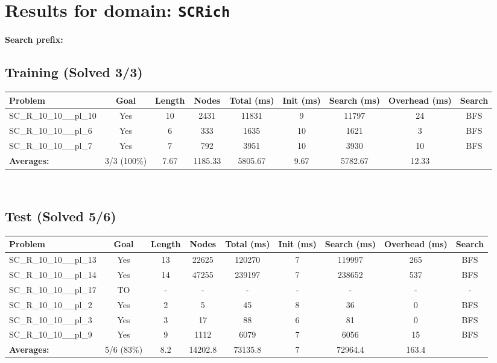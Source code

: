 \documentclass{article}
\begin{document}
\section*{Results for domain: \texttt{SCRich}}
\textbf{Search prefix:} 
\\[0.5cm]
\subsection*{Training (Solved 3/3)}
\begin{tabular}{lcccccccc}
\toprule
Problem & Goal & Length & Nodes & Total (ms) & Init (ms) & Search (ms) & Overhead (ms) & Search \\
\midrule
SC\_R\_10\_10\_\_pl\_10 & Yes & 10 & 2431 & 11831 & 9 & 11797 & 24 & BFS \\
SC\_R\_10\_10\_\_pl\_6 & Yes & 6 & 333 & 1635 & 10 & 1621 & 3 & BFS \\
SC\_R\_10\_10\_\_pl\_7 & Yes & 7 & 792 & 3951 & 10 & 3930 & 10 & BFS \\
\textbf{Averages:} & 3/3 (100\%) & 7.67 & 1185.33 & 5805.67 & 9.67 & 5782.67 & 12.33 & \\
\bottomrule
\end{tabular}
\\[0.7cm]
\subsection*{Test (Solved 5/6)}
\begin{tabular}{lcccccccc}
\toprule
Problem & Goal & Length & Nodes & Total (ms) & Init (ms) & Search (ms) & Overhead (ms) & Search \\
\midrule
SC\_R\_10\_10\_\_pl\_13 & Yes & 13 & 22625 & 120270 & 7 & 119997 & 265 & BFS \\
SC\_R\_10\_10\_\_pl\_14 & Yes & 14 & 47255 & 239197 & 7 & 238652 & 537 & BFS \\
SC\_R\_10\_10\_\_pl\_17 & TO & - & - & - & - & - & - & - \\
SC\_R\_10\_10\_\_pl\_2 & Yes & 2 & 5 & 45 & 8 & 36 & 0 & BFS \\
SC\_R\_10\_10\_\_pl\_3 & Yes & 3 & 17 & 88 & 6 & 81 & 0 & BFS \\
SC\_R\_10\_10\_\_pl\_9 & Yes & 9 & 1112 & 6079 & 7 & 6056 & 15 & BFS \\
\textbf{Averages:} & 5/6 (83\%) & 8.2 & 14202.8 & 73135.8 & 7 & 72964.4 & 163.4 & \\
\bottomrule
\end{tabular}
\\[0.7cm]
\end{document}
